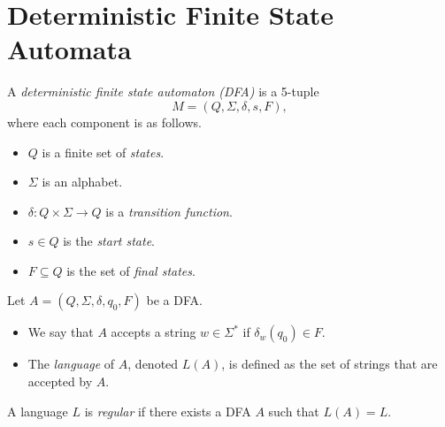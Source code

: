 \section{Deterministic Finite State Automata}
\begin{definition}
  A \emph{deterministic finite state automaton (DFA)} is a 5-tuple
  \begin{equation*}
    M = (Q, \Sigma, \delta, s, F),
  \end{equation*}
  where each component is as follows.
  \begin{itemize}
    \item $Q$ is a finite set of \emph{states}.
    \item $\Sigma$ is an alphabet.
    \item $\delta: Q \times \Sigma \to Q$ is a \emph{transition function}.
    \item $s \in Q$ is the \emph{start state}.
    \item $F \subseteq Q$ is the set of \emph{final states}.
  \end{itemize}
\end{definition}


\begin{definition}
  Let $A = (Q, \Sigma, \delta, q_0, F)$ be a DFA.
  \begin{itemize}
    \item We say that $A$ accepts a string $w \in \Sigma^*$ if
    $\delta_w(q_0) \in F$.
    \item The \emph{language} of $A$, denoted $L(A)$, is defined as the set of
    strings that are accepted by $A$.
  \end{itemize}
\end{definition}

\begin{definition}
  A language $L$ is \emph{regular} if there exists a DFA $A$ such that
  $L(A) = L$.
\end{definition}

